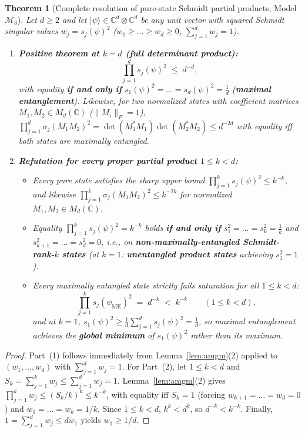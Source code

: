 \documentclass[11pt,a4paper]{article}
\theoremstyle{plain}
\newtheorem{theorem}{Theorem}[section]
\theoremstyle{definition}
\newcommand{\C}{\mathbb{C}}
\begin{document}
\begin{theorem}[Complete resolution of pure-state Schmidt partial products, Model $\mathcal{M}_3$]
\label{thm:m3}
Let $d \ge 2$ and let $|\psi\rangle \in \C^d \otimes \C^d$ be any unit vector with squared Schmidt singular values $w_j = s_j(\psi)^2$ ($w_1 \ge \dots \ge w_d \ge 0$, $\sum_{j=1}^d w_j = 1$).
\begin{enumerate}
  \item \textbf{Positive theorem at $k = d$ (full determinant product):}
  \[
    \prod_{j=1}^d s_j(\psi)^2 \;\le\; d^{-d},
  \]
  with equality \textbf{if and only if} $s_1(\psi)^2 = \dots = s_d(\psi)^2 = \frac{1}{d}$ (\textbf{maximal entanglement}). Likewise, for two normalized states with coefficient matrices $M_1, M_2 \in M_d(\C)$ ($\|M_i\|_F = 1$), $\prod_{j=1}^d \sigma_j(M_1 M_2)^2 = \det(M_1^* M_1)\det(M_2^* M_2) \le d^{-2d}$ with equality iff both states are maximally entangled.
  \item \textbf{Refutation for every proper partial product $1 \le k < d$:}
  \begin{itemize}
    \item Every pure state satisfies the sharp upper bound $\prod_{j=1}^k s_j(\psi)^2 \le k^{-k}$, and likewise $\prod_{j=1}^k \sigma_j(M_1 M_2)^2 \le k^{-2k}$ for normalized $M_1, M_2 \in M_d(\C)$.
    \item Equality $\prod_{j=1}^k s_j(\psi)^2 = k^{-k}$ holds \textbf{if and only if} $s_1^2 = \dots = s_k^2 = \frac{1}{k}$ and $s_{k+1}^2 = \dots = s_d^2 = 0$, i.e., on \textbf{non-maximally-entangled Schmidt-rank-$k$ states} (at $k = 1$: \textbf{unentangled product states} achieving $s_1^2 = 1$).
    \item Every maximally entangled state strictly fails saturation for all $1 \le k < d$:
    \[
      \prod_{j=1}^k s_j(\psi_{\mathrm{ME}})^2 \;=\; d^{-k} \;<\; k^{-k} \qquad (1 \le k < d),
    \]
    and at $k = 1$, $s_1(\psi)^2 \ge \frac{1}{d}\sum_{j=1}^d s_j(\psi)^2 = \frac{1}{d}$, so maximal entanglement achieves the \textbf{global minimum} of $s_1(\psi)^2$ rather than its maximum.
  \end{itemize}
\end{enumerate}
\end{theorem}
\begin{proof}
Part~(1) follows immediately from Lemma~\ref{lem:amgm}(2) applied to $(w_1,\dots,w_d)$ with $\sum_{j=1}^d w_j = 1$. For Part~(2), let $1 \le k < d$ and $S_k = \sum_{j=1}^k w_j \le \sum_{j=1}^d w_j = 1$. Lemma~\ref{lem:amgm}(2) gives $\prod_{j=1}^k w_j \le (S_k / k)^k \le k^{-k}$, with equality iff $S_k = 1$ (forcing $w_{k+1} = \dots = w_d = 0$) and $w_1 = \dots = w_k = 1/k$. Since $1 \le k < d$, $k^k < d^k$, so $d^{-k} < k^{-k}$. Finally, $1 = \sum_{j=1}^d w_j \le d w_1$ yields $w_1 \ge 1/d$.
\end{proof}
\end{document}
